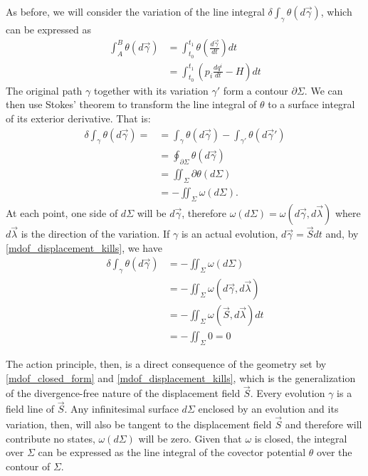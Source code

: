 \documentclass[10pt,twocolumn, nofootinbib]{revtex4-2}
\begin{document}
As before, we will consider the variation of the line integral $\delta \int_{\gamma} \theta(d\vec{\gamma})$, which can be expressed as
\begin{equation}
	\begin{aligned}
		\int_A^B \theta(d\vec{\gamma}) &= \int^{t_1}_{t_0} \theta\left(\frac{d\vec{\gamma}}{dt}\right) dt \\
		&= \int^{t_1}_{t_0} \left(p_i \frac{dq^i}{dt} - H \right) dt
	\end{aligned}
\end{equation}
The original path $\gamma$ together with its variation $\gamma'$ form a contour $\partial \Sigma$. We can then use Stokes' theorem to transform the line integral of $\theta$ to a surface integral of its exterior derivative. That is:
\begin{align*}
	\delta \int_{\gamma} \theta(d\vec{\gamma}) = 
	&= \int_{\gamma} \theta(d\vec{\gamma}) - \int_{\gamma'} \theta(d\vec{\gamma}') \\
	&= \oint_{\partial \Sigma} \theta(d\vec{\gamma}) \\
	&= \iint_{\Sigma} \partial \theta (d\Sigma) \\
	&= - \iint_{\Sigma} \omega(d\Sigma).
\end{align*}
At each point, one side of $d\Sigma$ will be $d\vec{\gamma}$, therefore $\omega(d\Sigma) = \omega(d\vec{\gamma}, d\vec{\lambda})$ where $d\vec{\lambda}$ is the direction of the variation. If $\gamma$ is an actual evolution, $d\vec{\gamma} = \vec{S} dt$ and, by \ref{mdof_displacement_kills}, we have
\begin{equation}
	\begin{aligned}
	\delta \int_{\gamma} \theta (d\vec{\gamma}) &= - \iint_{\Sigma} \omega(d\Sigma) \\
	&= - \iint_{\Sigma} \omega(d\vec{\gamma}, d\vec{\lambda}) \\
	&= - \iint_{\Sigma} \omega(\vec{S}, d\vec{\lambda}) dt \\
	&= - \iint_{\Sigma} 0 = 0
	\end{aligned}
\end{equation}

The action principle, then, is a direct consequence of the geometry set by \ref{mdof_closed_form} and \ref{mdof_displacement_kills}, which is the generalization of the divergence-free nature of the displacement field $\vec{S}$. Every evolution $\gamma$ is a field line of $\vec{S}$. Any infinitesimal surface $d\Sigma$ enclosed by an evolution and its variation, then, will also be tangent to the displacement field $\vec{S}$ and therefore will contribute no states, $\omega(d\Sigma)$ will be zero. Given that $\omega$ is closed, the integral over $\Sigma$ can be expressed as the line integral of the covector potential $\theta$ over the contour of $\Sigma$.
\end{document}

